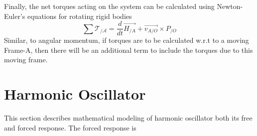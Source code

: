 Finally, the net torques acting on the system can be calculated using Newton-Euler's equations for rotating rigid bodies
\begin{equation}
	\sum \mathcal{T_{/A}} = \frac{d}{dt}\vec{H_{/A}} + \vec{v_{A/O}} \times P_{/O}
\end{equation}
Similar, to angular momentum, if torques are to be calculated w.r.t to a moving Frame-A, then there will be an additional term to include the torques due to this moving frame.


\section{Harmonic Oscillator}

This section describes mathematical modeling of harmonic oscillator both its free and forced response. The forced response is 